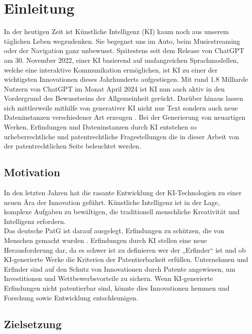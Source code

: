 \chapter{Einleitung \label{cha:chapter1}}

In der heutigen Zeit ist Künstliche Intelligenz (\gls{KI}) kaum 
noch aus unserem täglichen Leben wegzudenken. 
Sie begegnet uns im Auto, beim Musicstreaming oder der Navigation ganz unbewusst. 
Spätestens seit dem Release von ChatGPT am 30. November 2022, 
einer KI basierend auf umfangreichen Sprachmodellen, 
welche eine interaktive Kommunikation ermöglichen, 
\cite{ChatGPT} ist KI zu einer 
der wichtigsten Innovationen dieses Jahrhunderts aufgestiegen. 
Mit rund 1.8 Milliarde Nutzern von ChatGPT im Monat April 2024 
\cite{NumberChatGPTUsers2023} 
ist KI nun auch aktiv in den Vordergrund des Bewusstseins 
der Allgemeinheit gerückt. 
Darüber hinaus lassen sich mittlerweile mithilfe von generativer KI 
nicht nur Text sondern auch neue 
Dateninstanzen verschiedener Art erzeugen \cite{WasIstKuenstliche}. 
Bei der Generierung von neuartigen Werken, 
Erfindungen und Dateninstanzen durch KI entstehen so 
urheberrechtliche und 
patentrechtliche Fragestellungen die in dieser Arbeit von der 
patentrechtlichen Seite beleuchtet werden.

\section{Motivation\label{sec:moti}}

In den letzten Jahren hat die rasante Entwicklung 
der KI-Technologien zu einer neuen Ära der Innovation geführt. 
Künstliche Intelligenz ist in der Lage, komplexe Aufgaben zu bewältigen, 
die traditionell menschliche Kreativität und Intelligenz erfordern. 
\\

Das deutsche \gls{PatG} ist darauf ausgelegt, 
Erfindungen zu schützen, die von Menschen gemacht wurden
\cite{DPMAPatentschutz}. 
Erfindungen durch KI stellen eine neue Herausforderung dar, 
da es schwer ist zu definieren wer der „Erfinder“ ist und ob 
KI-generierte Werke die Kriterien der Patentierbarkeit erfüllen. 
Unternehmen und Erfinder sind auf den Schutz von Innovationen durch 
Patente angewiesen, um Investitionen und Wettbewerbsvorteile zu sichern. 
Wenn KI-generierte Erfindungen nicht patentierbar sind, 
könnte dies Innovationen hemmen und Forschung sowie Entwicklung entschleunigen. 

\section{Zielsetzung\label{sec:objective}}

